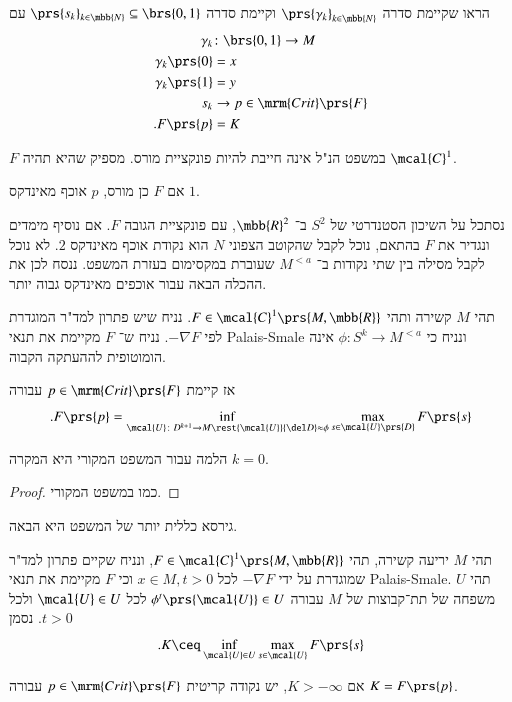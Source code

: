 \documentclass[a4paper,10pt,twoside,openany]{book}
\begin{document}
\begin{exercise}
הראו שקיימת סדרה
$\prs{\gamma_k}_{k \in \mbb{N}}$
וקיימת סדרה
$\prs{s_k}_{k \in \mbb{N}} \subseteq \brs{0,1}$
עם
\begin{align*}
\gamma_k &\colon \brs{0,1} \to M \\
\gamma_k\prs{0} &= x \\
\gamma_k\prs{1} &= y \\
s_k &\to p \in \mrm{Crit}\prs{F} \\
\text{.} F\prs{p} &= K
\end{align*}
\end{exercise}

\begin{remark}
$F$
במשפט הנ"ל
אינה חייבת להיות פונקציית מורס. מספיק שהיא תהיה
$\mcal{C}^1$.

אם
$F$
כן מורס,
$p$
אוכף מאינדקס
$1$.
\end{remark}

\begin{example}
נסתכל על השיכון הסטנדרטי של
$S^2$
ב־%
$\mbb{R}^2$,
עם פונקציית הגובה
$F$.
אם נוסיף מימדים ונגדיר את
$F$
בהתאם, נוכל לקבל שהקוטב הצפוני
$N$
הוא נקודת אוכף מאינדקס
$2$.
לא נוכל לקבל מסילה בין שתי נקודות ב־%
$M^{<a}$
שעוברת במקסימום בעזרת המשפט. ננסח לכן את ההכלה הבאה עבור אוכפים מאינדקס גבוה יותר.
\end{example}

\begin{theorem}
תהי
$M$
קשירה ותהי
$F \in \mcal{C}^1 \prs{M,\mbb{R}}$.
נניח שיש פתרון למד"ר המוגדרת לפי
$- \nabla F$.
נניח ש־%
$F$
מקיימת את תנאי
\textenglish{Palais-Smale}
ונניח כי
$\phi \colon S^k \to M^{<a}$
אינה הומוטופית לההעתקה הקבוה.

אז קיימת
$p \in \mrm{Crit}\prs{F}$
עבורה
\[\text{.} F\prs{p} = \inf_{\mcal{U} \colon D^{k+1} \to M \\ \rest{\mcal{U}}{\del D} \approx \phi} \max_{s \in \mcal{U}\prs{D}} F\prs{s}\]
\end{theorem}

\begin{remark}
הלמה עבור המשפט המקורי היא המקרה
$k = 0$.
\end{remark}

\begin{proof}
כמו במשפט המקורי.
\end{proof}

גירסא כללית יותר של המשפט היא הבאה.

\begin{theorem}
תהי
$M$
יריעה קשירה, תהי
$F \in \mcal{C}^1\prs{M,\mbb{R}}$,
ונניח שקיים פתרון למד"ר שמוגדרת על ידי
$-\nabla F$
לכל
$x \in M, t > 0$
וכי
$F$
מקיימת את תנאי
\textenglish{Palais-Smale}.
תהי
$U$
משפחה של תת־קבוצות של
$M$
עבורה
$\phi^t\prs{\mcal{U}} \in U$
לכל
$\mcal{U} \in U$
ולכל
$t > 0$.
נסמן
\[\text{.} K \ceq \inf_{\mcal{U} \in U} \max_{s \in \mcal{U}} F\prs{s}\]

אם
$K > -\infty$,
יש נקודה קריטית
$p \in \mrm{Crit}\prs{F}$
עבורה
$K = F\prs{p}$.
\end{theorem}
\end{document}
